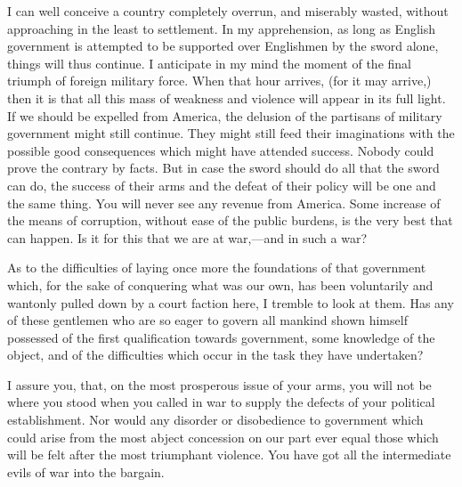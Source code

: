 I can well conceive a country completely overrun, and miserably wasted, without approaching in the least to settlement. In my apprehension, as long as English government is attempted to be supported over Englishmen by the sword alone, things will thus continue. I anticipate in my mind the moment of the final triumph of foreign military force. When that hour arrives, (for it may arrive,) then it is that all this mass of weakness and violence will appear in its full light. If we should be expelled from America, the delusion of the partisans of military government might still continue. They might still feed their imaginations with the possible good consequences which might have attended success. Nobody could prove the contrary by facts. But in case the sword should do all that the sword can do, the success of their arms and the defeat of their policy will be one and the same thing. You will never see any revenue from America. Some increase of the means of corruption, without ease of the public burdens, is the very best that can happen. Is it for this that we are at war,—and in such a war?

As to the difficulties of laying once more the foundations of that government which, for the sake of conquering what was our own, has been voluntarily and wantonly pulled down by a court faction here, I tremble to look at them. Has any of these gentlemen who are so eager to govern all mankind shown himself possessed of the first qualification towards government, some knowledge of the object, and of the difficulties which occur in the task they have undertaken?

I assure you, that, on the most prosperous issue of your arms, you will not be where you stood when you called in war to supply the defects of your political establishment. Nor would any disorder or disobedience to government which could arise from the most abject concession on our part ever equal those which will be felt after the most triumphant violence. You have got all the intermediate evils of war into the bargain.

